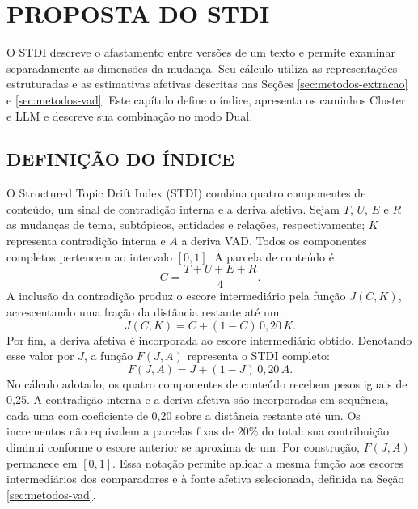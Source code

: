 \chapter{PROPOSTA DO STDI}
\label{ch:stdi}

O STDI descreve o afastamento entre versões de um texto e permite examinar separadamente as dimensões da mudança. Seu cálculo utiliza as representações estruturadas e as estimativas afetivas descritas nas Seções \ref{sec:metodos-extracao} e \ref{sec:metodos-vad}. Este capítulo define o índice, apresenta os caminhos Cluster e LLM e descreve sua combinação no modo Dual.

\section{DEFINIÇÃO DO ÍNDICE}
\label{sec:stdi-definicao}

O Structured Topic Drift Index (STDI) combina quatro componentes de conteúdo, um sinal de contradição interna e a deriva afetiva. Sejam $T$, $U$, $E$ e $R$ as mudanças de tema, subtópicos, entidades e relações, respectivamente; $K$ representa contradição interna e $A$ a deriva VAD. Todos os componentes completos pertencem ao intervalo $[0,1]$. A parcela de conteúdo é
\begin{equation}
 C = \frac{T+U+E+R}{4}.
 \label{eq:stdi-conteudo}
\end{equation}
A inclusão da contradição produz o escore intermediário pela função $J(C,K)$, acrescentando uma fração da distância restante até um:
\begin{equation}
 J(C,K) = C + (1-C)\,0{,}20\,K.
 \label{eq:stdi-contradicao}
\end{equation}
Por fim, a deriva afetiva é incorporada ao escore intermediário obtido. Denotando esse valor por $J$, a função $F(J,A)$ representa o STDI completo:
\begin{equation}
 F(J,A) = J + (1-J)\,0{,}20\,A.
 \label{eq:stdi-completo}
\end{equation}
No cálculo adotado, os quatro componentes de conteúdo recebem pesos iguais de 0,25. A contradição interna e a deriva afetiva são incorporadas em sequência, cada uma com coeficiente de 0,20 sobre a distância restante até um. Os incrementos não equivalem a parcelas fixas de 20\% do total: sua contribuição diminui conforme o escore anterior se aproxima de um. Por construção, $F(J,A)$ permanece em $[0,1]$. Essa notação permite aplicar a mesma função aos escores intermediários dos comparadores e à fonte afetiva selecionada, definida na Seção \ref{sec:metodos-vad}.

